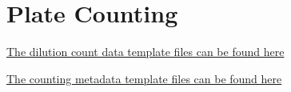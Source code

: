 \documentclass[]{book}
\begin{document}
\chapter{Plate Counting}\label{plate-counting}

\href{https://github.com/lyonsm7/impactb_book/raw/master/file_collection_templates/Base_Period/dilution_counts_for_plates.xlsx}{The
dilution count data template files can be found here}

\href{https://github.com/lyonsm7/impactb_book/raw/master/file_collection_templates/Base_Period/inoculum_meta_data_plating.xlsx}{The
counting metadata template files can be found here}


\end{document}
